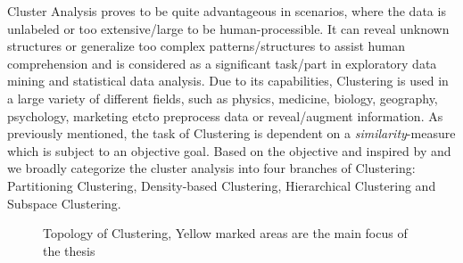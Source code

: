 Cluster Analysis proves to be quite advantageous in scenarios, where the data is unlabeled or too extensive/large to be human-processible. It can reveal unknown structures or generalize too complex patterns/structures to assist human comprehension and is considered as a significant task/part in exploratory data mining and statistical data analysis. Due to its capabilities, Clustering is used in a large variety of different fields, such as physics, medicine, biology, geography, psychology, marketing etc\. to preprocess data or reveal/augment information\cite{kriegel2009clustering}.
As previously mentioned, the task of Clustering is dependent on a \textit{similarity}-measure which is subject to an objective goal. Based on the objective and inspired by \textcite{validationhalkidi2001clustering} and \textcite[Chapter 10.1.3]{han2011data} we broadly categorize the cluster analysis into four branches of Clustering: Partitioning Clustering, Density-based Clustering, Hierarchical Clustering and Subspace Clustering. 
\begin{figure}
    \centering
    \caption{Topology of Clustering, Yellow marked areas are the main focus of the thesis}
    \label{fig:clusteringtree}
\end{figure}


